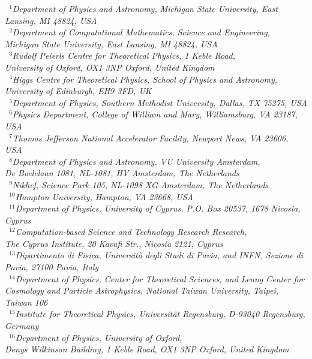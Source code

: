 \documentclass[twoside,12pt]{article}
\numberwithin{equation}{section}
\numberwithin{figure}{section}
\numberwithin{table}{section}
\begin{document}
\begin{center}
\vspace{.2cm}
{\it \footnotesize
~$^{1}$Department of Physics and Astronomy, 
Michigan State University, East Lansing, MI 48824, USA\\
~$^{2}$Department of Computational Mathematics, Science and Engineering,\\
Michigan State University, East Lansing, MI 48824, USA\\
~$^{3}$Rudolf Peierls Centre for Theoretical Physics, 1 Keble Road,\\ 
University of Oxford, OX1 3NP Oxford, United Kingdom\\
~$^{4}$Higgs Centre for Theoretical Physics, School of Physics and Astronomy,\\ 
University of Edinburgh, EH9 3FD, UK\\
~$^{5}$Department of Physics, 
Southern Methodist University, Dallas, TX 75275, USA\\
~$^{6}$Physics Department, 
College of William and Mary, Williamsburg, VA 23187, USA\\
~$^{7}$Thomas Jefferson National Accelerator Facility, 
Newport News, VA 23606, USA\\
~$^{8}$Department of Physics and Astronomy, VU University Amsterdam,\\
De Boelelaan 1081, NL-1081, HV Amsterdam, The Netherlands\\
~$^{9}$Nikhef, Science Park 105, NL-1098 XG Amsterdam, The Netherlands\\
~$^{10}$Hampton University, Hampton, VA 23668, USA\\
~$^{11}$Department of Physics, 
University of Cyprus, P.O. Box 20537, 1678 Nicosia, Cyprus\\
~$^{12}$Computation-based Science and Technology Research Research,\\
The Cyprus Institute, 20 Kavafi Str., Nicosia 2121, Cyprus\\
~$^{13}$Dipartimento di Fisica, Universit\`{a} degli Studi di Pavia, and INFN, 
Sezione di Pavia, 27100 Pavia, Italy\\
~$^{14}$Department of Physics, Center for Theoretical Sciences,
and Leung Center for Cosmology and Particle Astrophysics,
National Taiwan University, Taipei, Taiwan 106\\
~$^{15}$Institute for Theoretical Physics, 
Universit\"at Regensburg, D-93040 Regensburg, Germany\\
~$^{16}$Department of Physics, University of Oxford,\\
Denys Wilkinson Building, 1 Keble Road, OX1 3NP Oxford, United Kingdom\\
}
\end{center}
\end{document}
